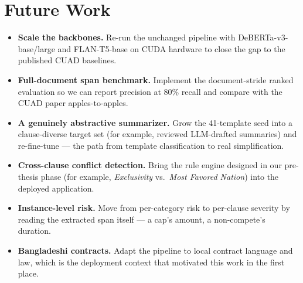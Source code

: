 \section{Future Work}
\begin{itemize}[itemsep=2pt]
  \item \textbf{Scale the backbones.} Re-run the unchanged pipeline with DeBERTa-v3-base/large and FLAN-T5-base on CUDA hardware to close the gap to the published CUAD baselines.
  \item \textbf{Full-document span benchmark.} Implement the document-stride ranked evaluation so we can report precision at 80\% recall and compare with the CUAD paper apples-to-apples.
  \item \textbf{A genuinely abstractive summarizer.} Grow the 41-template seed into a clause-diverse target set (for example, reviewed LLM-drafted summaries) and re-fine-tune --- the path from template classification to real simplification.
  \item \textbf{Cross-clause conflict detection.} Bring the rule engine designed in our pre-thesis phase (for example, \emph{Exclusivity} vs.\ \emph{Most Favored Nation}) into the deployed application.
  \item \textbf{Instance-level risk.} Move from per-category risk to per-clause severity by reading the extracted span itself --- a cap's amount, a non-compete's duration.
  \item \textbf{Bangladeshi contracts.} Adapt the pipeline to local contract language and law, which is the deployment context that motivated this work in the first place.
\end{itemize}
